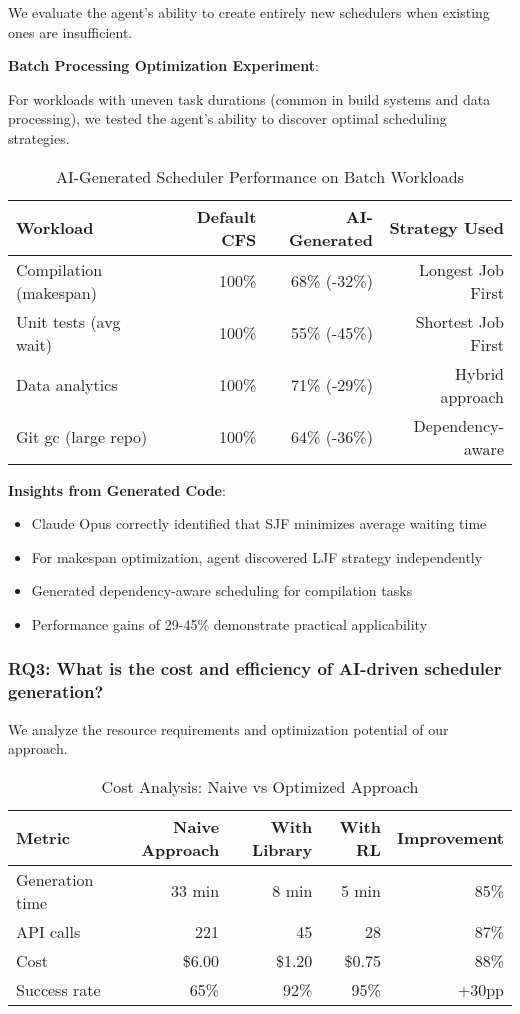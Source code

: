 We evaluate the agent's ability to create entirely new schedulers when existing ones are insufficient.

\textbf{Batch Processing Optimization Experiment}:

For workloads with uneven task durations (common in build systems and data processing), we tested the agent's ability to discover optimal scheduling strategies.

\begin{table}[h]
\caption{AI-Generated Scheduler Performance on Batch Workloads}
\label{tab:batch-results}
\begin{tabular}{lrrr}
\toprule
Workload & Default CFS & AI-Generated & Strategy Used \\
\midrule
Compilation (makespan) & 100\% & 68\% (-32\%) & Longest Job First \\
Unit tests (avg wait) & 100\% & 55\% (-45\%) & Shortest Job First \\
Data analytics & 100\% & 71\% (-29\%) & Hybrid approach \\
Git gc (large repo) & 100\% & 64\% (-36\%) & Dependency-aware \\
\bottomrule
\end{tabular}
\end{table}

\textbf{Insights from Generated Code}:
\begin{itemize}
\item Claude Opus correctly identified that SJF minimizes average waiting time
\item For makespan optimization, agent discovered LJF strategy independently
\item Generated dependency-aware scheduling for compilation tasks
\item Performance gains of 29-45\% demonstrate practical applicability
\end{itemize}

\subsubsection{RQ3: What is the cost and efficiency of AI-driven scheduler generation?}

We analyze the resource requirements and optimization potential of our approach.

\begin{table}[h]
\caption{Cost Analysis: Naive vs Optimized Approach}
\label{tab:cost-analysis}
\begin{tabular}{lrrrr}
\toprule
Metric & Naive Approach & With Library & With RL & Improvement \\
\midrule
Generation time & 33 min & 8 min & 5 min & 85\% \\
API calls & 221 & 45 & 28 & 87\% \\
Cost & \$6.00 & \$1.20 & \$0.75 & 88\% \\
Success rate & 65\% & 92\% & 95\% & +30pp \\
\bottomrule
\end{tabular}
\end{table}


